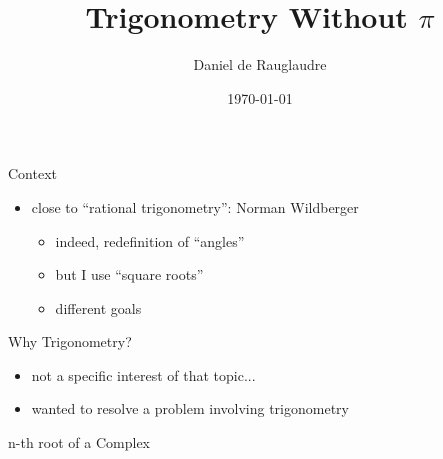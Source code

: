 \documentclass{beamer}
\title{Trigonometry Without $\pi$}
\author{Daniel de Rauglaudre}
\date{\today}
\begin{document}
\begin{frame}
    \titlepage
\end{frame}

\begin{frame}{}
\end{frame}

\begin{frame}{Context}
  \begin{itemize}
    \item close to ``rational trigonometry'':  Norman Wildberger
      \begin{itemize}
      \item indeed, redefinition of ``angles''
      \item but I use ``square roots''
      \item different goals
      \end{itemize}
  \end{itemize}
\end{frame}

\begin{frame}{Why Trigonometry?}
  \begin{itemize}
  \item not a specific interest of that topic...
  \item wanted to resolve a problem involving trigonometry
  \end{itemize}
\end{frame}

\begin{frame}{n-th root of a Complex}
\end{frame}
\end{document}
